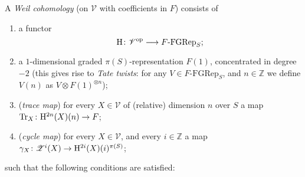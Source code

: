 \documentclass[a4paper,10pt]{article}
\def\basepieces{\mathscr{V}}
\newcommand{\fgrep}[2]{#1\textrm{-}\mathrm{FGRep}_{#2}}
\def\coh{\mathrm{H}}
\def\tensor{\otimes}
\def\cyc{\mathscr{Z}}
\def\Tr{\mathrm{Tr}}
\begin{document}
A \emph{Weil cohomology} (on $\basepieces$ with coefficients in $F$) consists
of
\begin{enumerate}[label=(D\arabic*)] %
	\item a functor
		\[
			\map[\coh]%
			{\basepieces^{\mathrm{op}}}%
			{\fgrep{F}{S}};
		\]
	\item a $1$-dimensional graded $\pi(S)$-representation $F(1)$,
		concentrated in degree $-2$ (this gives rise to \emph{Tate
		twists}: for any $V \in \fgrep{F}{S}$, and $n \in \mathbb{Z}$
		we define $V(n)$ as $V \tensor F(1)^{\tensor n}$);
	\item (\emph{trace map}) for every $X \in \basepieces$ of (relative)
		dimension $n$ over $S$ a map
		$\map[\Tr_{X}]{\coh^{2n}(X)(n)}{F}$;
	\item (\emph{cycle map}) for every $X \in \basepieces$, and every $i
		\in \mathbb{Z}$ a map
		$\map[\gamma_{X}] {\cyc^{i}(X)}{\coh^{2i}(X)(i)^{\pi(S)}}$;
\end{enumerate} %
such that the following conditions are satisfied:
\end{document}
